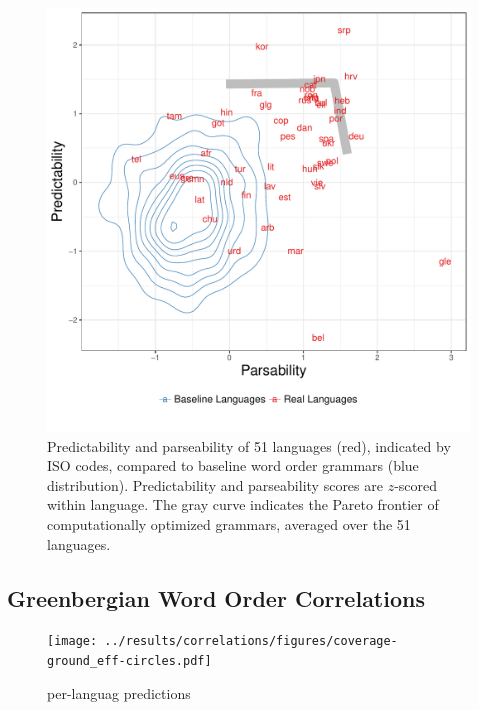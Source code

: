 \documentclass[9pt,twocolumn,twoside,lineno]{pnas-new}
\begin{document}
\begin{figure}
    \centering
    \includegraphics[scale=.45]{../results/plane/pareto-plane-iso-best-balanced-legend-viz.pdf}
    \caption{Predictability and parseability of 51 languages (red), indicated by ISO codes, compared to baseline word order grammars (blue distribution). Predictability and parseability scores are $z$-scored within language. The gray curve indicates the Pareto frontier of computationally optimized grammars, averaged over the 51 languages.} %
    \label{fig:pareto-plane}
\end{figure}


\subsection{Greenbergian Word Order Correlations}
\label{sec:greenberg}

\begin{figure} %
	\texttt{[image: ../results/correlations/figures/coverage-ground\_eff-circles.pdf]}
	\caption{per-languag predictions}\label{fig:per-lang}
\end{figure}
\end{document}
